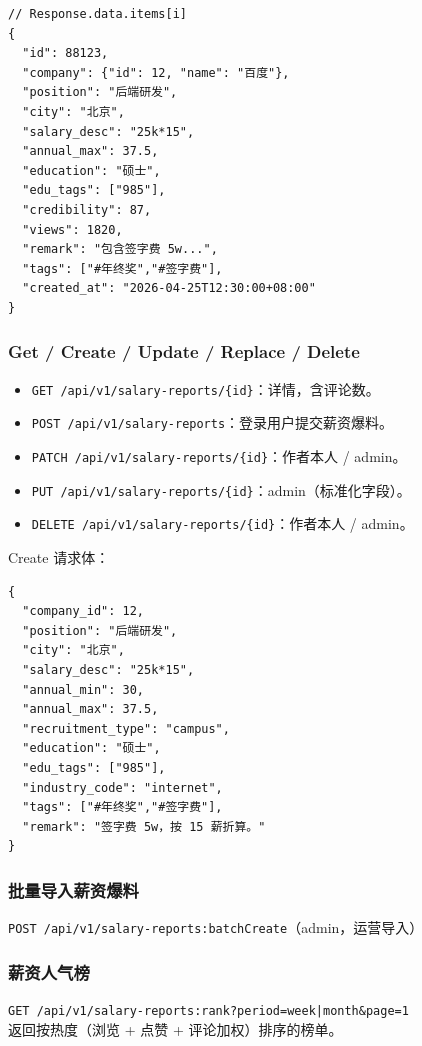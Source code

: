 \documentclass[11pt,a4paper]{ctexart}
\begin{document}
\begin{lstlisting}
// Response.data.items[i]
{
  "id": 88123,
  "company": {"id": 12, "name": "百度"},
  "position": "后端研发",
  "city": "北京",
  "salary_desc": "25k*15",
  "annual_max": 37.5,
  "education": "硕士",
  "edu_tags": ["985"],
  "credibility": 87,
  "views": 1820,
  "remark": "包含签字费 5w...",
  "tags": ["#年终奖","#签字费"],
  "created_at": "2026-04-25T12:30:00+08:00"
}
\end{lstlisting}

\subsubsection{Get / Create / Update / Replace / Delete}
\begin{itemize}[leftmargin=2em]
    \item \texttt{GET    /api/v1/salary-reports/\{id\}}：详情，含评论数。
    \item \texttt{POST   /api/v1/salary-reports}：登录用户提交薪资爆料。
    \item \texttt{PATCH  /api/v1/salary-reports/\{id\}}：作者本人 / admin。
    \item \texttt{PUT    /api/v1/salary-reports/\{id\}}：admin（标准化字段）。
    \item \texttt{DELETE /api/v1/salary-reports/\{id\}}：作者本人 / admin。
\end{itemize}
Create 请求体：
\begin{lstlisting}
{
  "company_id": 12,
  "position": "后端研发",
  "city": "北京",
  "salary_desc": "25k*15",
  "annual_min": 30,
  "annual_max": 37.5,
  "recruitment_type": "campus",
  "education": "硕士",
  "edu_tags": ["985"],
  "industry_code": "internet",
  "tags": ["#年终奖","#签字费"],
  "remark": "签字费 5w，按 15 薪折算。"
}
\end{lstlisting}

\subsubsection{批量导入薪资爆料}
\texttt{POST /api/v1/salary-reports:batchCreate}（admin，运营导入）

\subsubsection{薪资人气榜}
\texttt{GET /api/v1/salary-reports:rank?period=week|month\&page=1}\\
返回按热度（浏览 + 点赞 + 评论加权）排序的榜单。
\end{document}
